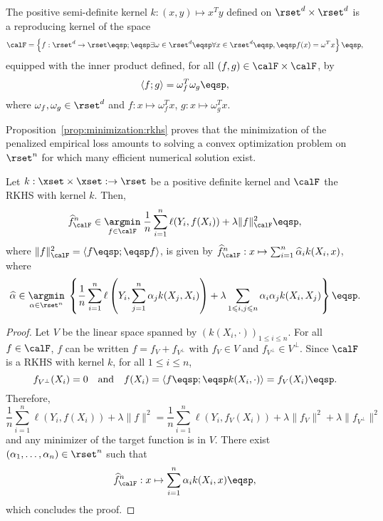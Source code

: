 \begin{remark}
The positive semi-definite kernel $k:(x,y)\mapsto x^Ty$ defined on $\rset^d\times\rset^d$ is a reproducing kernel of the space
$$
\calF = \left\{f: \rset^d\to\rset\eqsp;\eqsp \exists \omega\in\rset^d \eqsp\forall x\in \rset^d\eqsp, \eqsp f(x) = \omega^Tx\right\}\eqsp,
$$
equipped with the inner product defined, for all $(f,g)\in\calF\times\calF$, by 
$$
\langle f; g\rangle = \omega_f^T\omega_g\eqsp, 
$$
where $\omega_f,\omega_g\in\rset^d$ and $f: x\mapsto \omega_f^Tx$, $g: x\mapsto \omega_g^Tx$. 
\end{remark}

Proposition~\ref{prop:minimization:rkhs} proves that the minimization of the penalized empirical loss amounts to solving a convex optimization problem on $\rset^n$ for which many efficient  numerical solution exist.
\begin{shaded}
\begin{proposition}
\label{prop:minimization:rkhs}
Let $k:\xset\times\xset:\to \rset$ be a positive definite kernel and $\calF$ the RKHS with kernel $k$. Then, 
\[
\widehat f^n_{\calF} \in \underset{f\in\calF}{\argmin}\;\frac{1}{n}\sum_{i=1}^n \ell(Y_i,f(X_i)) + \lambda\|f\|_\calF^2\eqsp,
\]
where $\|f\|^2_\calF = \langle f\eqsp;\eqsp f\rangle$, is given by $\widehat f^n_{\calF} : x \mapsto \sum_{i=1}^n \widehat \alpha_i k(X_i,x)$, where
\[
\widehat\alpha \in \underset{\alpha \in \rset^n}{\argmin}\;\left\{\frac{1}{n}\sum_{i=1}^n \ell\left(Y_i,\sum_{j=1}^n\alpha_jk(X_j,X_i)\right) + \lambda \sum_{1\leqslant i,j \leqslant n}\alpha_i \alpha_j k(X_i,X_j)\right\}\eqsp.
\]
\end{proposition}
\end{shaded}
\begin{proof}
Let $V$ be the linear space spanned by $(k(X_i,\cdot))_{1\leqslant i\leqslant n}$. For all $f\in\calF$, $f$ can be written $f = f_V + f_{V^\perp}$ with $f_V\in V$ and $f_{V^\perp}\in V^\perp$. Since $\calF$ is a RKHS with kernel $k$, for all $1\leqslant i \leqslant n$,
\[
f_{V^\perp}(X_i) = 0\quad \mathrm{and} \quad f(X_i) = \langle f\eqsp;\eqsp k(X_i,\cdot)\rangle = f_V(X_i)\eqsp.
\]
Therefore,
\[
\frac{1}{n}\sum_{i=1}^n \ell(Y_i,f(X_i)) + \lambda\|f\|^2 = \frac{1}{n}\sum_{i=1}^n \ell(Y_i,f_V(X_i)) + \lambda\|f_V\|^2 + \lambda\|f_{V^\perp}\|^2
\]
and any minimizer of the target function is in $V$. There exist $(\alpha_1,\ldots,\alpha_n)\in \rset^n$ such that 
\[
\widehat f^n_{\calF} :x\mapsto \sum_{i=1}^n \alpha_i k(X_i,x)\eqsp,
\]
which concludes the proof.
\end{proof}
